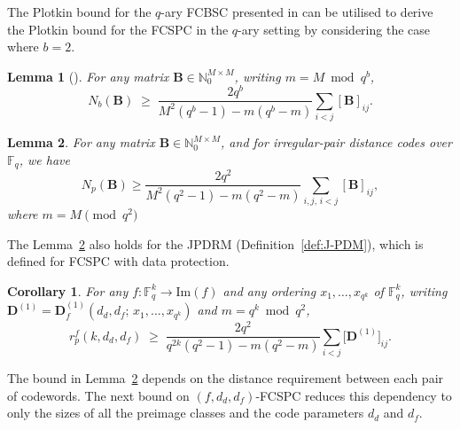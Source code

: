 \documentclass[11pt,draftclsnofoot,journal,onecolumn]{IEEEtran}
\newtheorem{lemma}{Lemma}
\newtheorem{theorem}{Theorem}
\newtheorem{corollary}{Corollary}
\newcommand{\Img}{\mathrm{Im}}
\begin{document}
    The Plotkin bound for the $q$-ary FCBSC presented in \cite{singh2025function} can be utilised to derive the Plotkin bound for the FCSPC in the $q$-ary setting by considering the case where $b = 2$.

    \begin{lemma}[{\cite{singh2025function}}]
    \label{lem:plotkin-b}
    For any matrix $\boldsymbol{B} \in \mathbb{N}_0^{M \times M}$, writing $m = M \bmod q^{b}$,
    \[
    N_b(\boldsymbol{B}) \;\ge\;
    \frac{2q^{b}}{M^{2}(q^{b}-1) - m(q^{b}-m)}
    \sum_{i<j} [\boldsymbol{B}]_{ij}.
    \]
    \end{lemma}
    
    

    \begin{lemma}
    \label{lem:plotkin-qary}
       For any matrix $\boldsymbol{B} \in \mathbb{N}_0^{M \times M}$, and for irregular-pair distance codes over $\mathbb{F}_q$, we have
       \[
            N_p(\boldsymbol{B}) \ge \frac{2q^2}{M^2(q^2 - 1) - m(q^2 - m)} \sum_{i,j, \, i<j} [\boldsymbol{B}]_{ij},
       \]
       where $m = M \pmod{q^2}$
    \end{lemma}

    The Lemma~\ref{lem:plotkin-qary} also holds for the JPDRM (Definition~\ref{def:J-PDM}), which is defined for FCSPC with data protection.

    
    
    \begin{corollary}
    \label{cor:plotkin-jpdm}
    For any $f : \mathbb{F}_q^k \to \mathrm{Im}(f)$ and any ordering $x_1,\dots,x_{q^k}$ of $\mathbb{F}_q^{k}$, writing $\boldsymbol{D}^{(1)} = \boldsymbol{D}^{(1)}_{f}(d_d,d_f;\,x_1,\dots,x_{q^k})$ and $m = q^{k} \bmod q^{2}$,
    \[
    r_p^f(k,d_d,d_f) \;\ge\;
    \frac{2q^{2}}{q^{2k}(q^{2}-1) - m(q^{2}-m)}
    \sum_{i<j} \bigl[\boldsymbol{D}^{(1)}\bigr]_{ij}.
    \]
    \end{corollary}


    The bound in Lemma~\ref{lem:plotkin-qary} depends on the distance requirement between each pair of codewords. The next bound on $(f, d_d, d_f)$-FCSPC reduces this dependency to only the sizes of all the preimage classes and the code parameters $d_d$ and $d_f$. 

\end{document}
